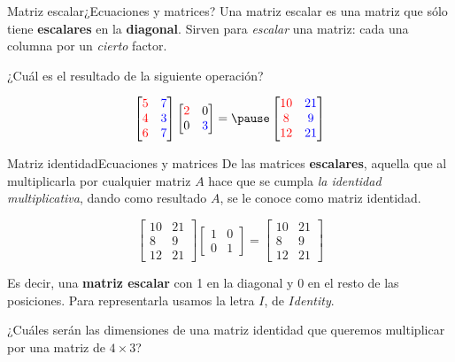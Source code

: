 \documentclass[spanish, c]{beamer}
\begin{document}
\begin{frame}{Matriz escalar}{¿Ecuaciones y matrices?}
    Una \alert{matriz escalar} es una matriz que sólo tiene \textbf{escalares} en la \textbf{diagonal}. Sirven para \textit{escalar} una matriz: cada una columna por un \textit{cierto} factor. \pause

    \bigskip

    ¿Cuál es el resultado de la siguiente operación? \bigskip

    \[
        \begin{bmatrix}
            \color{red} 5 & \color{blue} 7 \\
            \color{red} 4 & \color{blue} 3 \\
            \color{red} 6 & \color{blue} 7
        \end{bmatrix}
        \begin{bmatrix*}
            \color{red} 2 & 0 \\
            0 & \color{blue} 3
        \end{bmatrix*} = \pause
        \begin{bmatrix*}
            \color{red} 10 & \color{blue} 21 \\
            \color{red} 8 & \color{blue} 9 \\
            \color{red} 12 & \color{blue} 21
        \end{bmatrix*}
    \]
\end{frame}

\begin{frame}{Matriz identidad}{Ecuaciones y matrices}
    De las matrices \textbf{escalares}, aquella que al multiplicarla por cualquier matriz $A$ hace que se cumpla \textit{la identidad multiplicativa}, dando como resultado $A$, se le conoce como \alert{matriz identidad}. \pause

    \bigskip

    \[
        \begin{bmatrix*}
            10 & 21 \\
            8 & 9 \\
            12 & 21
        \end{bmatrix*}
        \begin{bmatrix*}
            1 & 0  \\
            0 & 1
        \end{bmatrix*} = \begin{bmatrix*}
            10 & 21 \\
            8 & 9 \\
            12 & 21
        \end{bmatrix*}
    \] \pause

    \bigskip

    Es decir, una \textbf{matriz escalar} con 1 en la diagonal y 0 en el resto de las posiciones. Para representarla usamos la letra $I$, de $I$\textit{dentity}. \pause

    \bigskip

    ¿Cuáles serán las dimensiones de una \alert{matriz identidad} que queremos multiplicar por una matriz de $4 \times 3$?
\end{frame}
\end{document}
